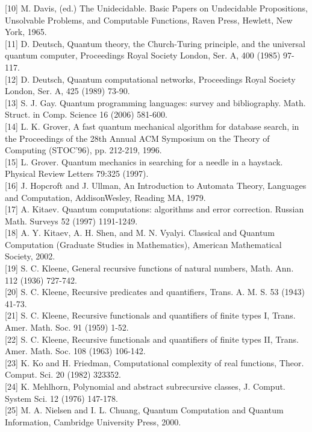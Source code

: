 \documentclass[10pt]{article}
\begin{document}
[10] M. Davis, (ed.) The Unidecidable. Basic Papers on Undecidable Propositions, Unsolvable Problems, and Computable Functions, Raven Press, Hewlett, New York, 1965.\\[0pt]
[11] D. Deutsch, Quantum theory, the Church-Turing principle, and the universal quantum computer, Proceedings Royal Society London, Ser. A, 400 (1985) 97-117.\\[0pt]
[12] D. Deutsch, Quantum computational networks, Proceedings Royal Society London, Ser. A, 425 (1989) 73-90.\\[0pt]
[13] S. J. Gay. Quantum programming languages: survey and bibliography. Math. Struct. in Comp. Science 16 (2006) 581-600.\\[0pt]
[14] L. K. Grover, A fast quantum mechanical algorithm for database search, in the Proceedings of the 28th Annual ACM Symposium on the Theory of Computing (STOC'96), pp. 212-219, 1996.\\[0pt]
[15] L. Grover. Quantum mechanics in searching for a needle in a haystack. Physical Review Letters 79:325 (1997).\\[0pt]
[16] J. Hopcroft and J. Ullman, An Introduction to Automata Theory, Languages and Computation, AddisonWesley, Reading MA, 1979.\\[0pt]
[17] A. Kitaev. Quantum computations: algorithms and error correction. Russian Math. Surveys 52 (1997) 1191-1249.\\[0pt]
[18] A. Y. Kitaev, A. H. Shen, and M. N. Vyalyi. Classical and Quantum Computation (Graduate Studies in Mathematics), American Mathematical Society, 2002.\\[0pt]
[19] S. C. Kleene, General recursive functions of natural numbers, Math. Ann. 112 (1936) 727-742.\\[0pt]
[20] S. C. Kleene, Recursive predicates and quantifiers, Trans. A. M. S. 53 (1943) 41-73.\\[0pt]
[21] S. C. Kleene, Recursive functionals and quantifiers of finite types I, Trans. Amer. Math. Soc. 91 (1959) 1-52.\\[0pt]
[22] S. C. Kleene, Recursive functionals and quantifiers of finite types II, Trans. Amer. Math. Soc. 108 (1963) 106-142.\\[0pt]
[23] K. Ko and H. Friedman, Computational complexity of real functions, Theor. Comput. Sci. 20 (1982) 323352.\\[0pt]
[24] K. Mehlhorn, Polynomial and abstract subrecursive classes, J. Comput. System Sci. 12 (1976) 147-178.\\[0pt]
[25] M. A. Nielsen and I. L. Chuang, Quantum Computation and Quantum Information, Cambridge University Press, 2000.\\[0pt]
\end{document}
